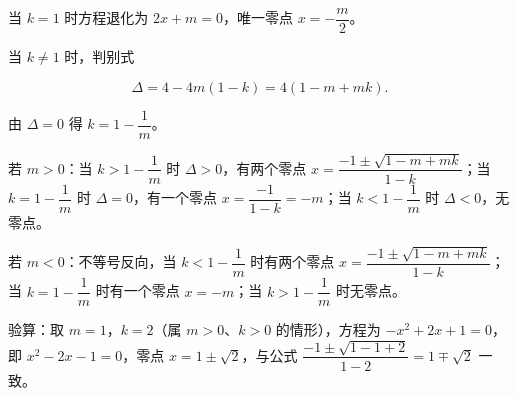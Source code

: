 \begin{answer}
当 $k=1$ 时方程退化为 $2x+m=0$，唯一零点 $x=-\dfrac m2$。

当 $k\neq1$ 时，判别式

\nopagebreak[4]
\[\Delta=4-4m(1-k)=4(1-m+mk).\]

由 $\Delta=0$ 得 $k=1-\dfrac1m$。

若 $m>0$：当 $k>1-\dfrac1m$ 时 $\Delta>0$，有两个零点 $x=\dfrac{-1\pm\sqrt{1-m+mk}}{1-k}$；当 $k=1-\dfrac1m$ 时 $\Delta=0$，有一个零点 $x=\dfrac{-1}{1-k}=-m$；当 $k<1-\dfrac1m$ 时 $\Delta<0$，无零点。

若 $m<0$：不等号反向，当 $k<1-\dfrac1m$ 时有两个零点 $x=\dfrac{-1\pm\sqrt{1-m+mk}}{1-k}$；当 $k=1-\dfrac1m$ 时有一个零点 $x=-m$；当 $k>1-\dfrac1m$ 时无零点。

验算：取 $m=1$，$k=2$（属 $m>0$、$k>0$ 的情形），方程为 $-x^2+2x+1=0$，即 $x^2-2x-1=0$，零点 $x=1\pm\sqrt2$，与公式 $\dfrac{-1\pm\sqrt{1-1+2}}{1-2}=1\mp\sqrt2$ 一致。


\end{answer}
